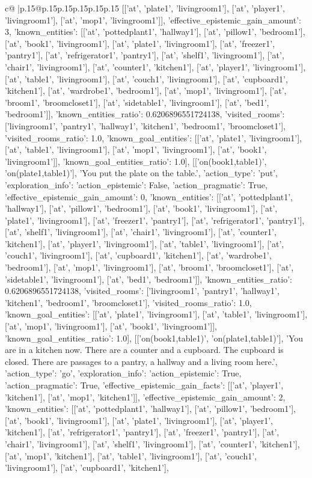 \documentclass{article}
\begin{document}
{\begin{supertabular}{c@{$\;$}|p{.15\linewidth}@{}p{.15\linewidth}p{.15\linewidth}p{.15\linewidth}p{.15\linewidth}p{.15\linewidth}}
{{{[['at', 'plate1', 'livingroom1'], ['at', 'player1', 'livingroom1'], ['at', 'mop1', 'livingroom1']], 'effective_epistemic_gain_amount': 3, 'known_entities': [['at', 'pottedplant1', 'hallway1'], ['at', 'pillow1', 'bedroom1'], ['at', 'book1', 'livingroom1'], ['at', 'plate1', 'livingroom1'], ['at', 'freezer1', 'pantry1'], ['at', 'refrigerator1', 'pantry1'], ['at', 'shelf1', 'livingroom1'], ['at', 'chair1', 'livingroom1'], ['at', 'counter1', 'kitchen1'], ['at', 'player1', 'livingroom1'], ['at', 'table1', 'livingroom1'], ['at', 'couch1', 'livingroom1'], ['at', 'cupboard1', 'kitchen1'], ['at', 'wardrobe1', 'bedroom1'], ['at', 'mop1', 'livingroom1'], ['at', 'broom1', 'broomcloset1'], ['at', 'sidetable1', 'livingroom1'], ['at', 'bed1', 'bedroom1']], 'known_entities_ratio': 0.6206896551724138, 'visited_rooms': ['livingroom1', 'pantry1', 'hallway1', 'kitchen1', 'bedroom1', 'broomcloset1'], 'visited_rooms_ratio': 1.0, 'known_goal_entities': [['at', 'plate1', 'livingroom1'], ['at', 'table1', 'livingroom1'], ['at', 'mop1', 'livingroom1'], ['at', 'book1', 'livingroom1']], 'known_goal_entities_ratio': 1.0}}], [['on(book1,table1)', 'on(plate1,table1)'], 'You put the plate on the table.', {'action_type': 'put', 'exploration_info': {'action_epistemic': False, 'action_pragmatic': True, 'effective_epistemic_gain_amount': 0, 'known_entities': [['at', 'pottedplant1', 'hallway1'], ['at', 'pillow1', 'bedroom1'], ['at', 'book1', 'livingroom1'], ['at', 'plate1', 'livingroom1'], ['at', 'freezer1', 'pantry1'], ['at', 'refrigerator1', 'pantry1'], ['at', 'shelf1', 'livingroom1'], ['at', 'chair1', 'livingroom1'], ['at', 'counter1', 'kitchen1'], ['at', 'player1', 'livingroom1'], ['at', 'table1', 'livingroom1'], ['at', 'couch1', 'livingroom1'], ['at', 'cupboard1', 'kitchen1'], ['at', 'wardrobe1', 'bedroom1'], ['at', 'mop1', 'livingroom1'], ['at', 'broom1', 'broomcloset1'], ['at', 'sidetable1', 'livingroom1'], ['at', 'bed1', 'bedroom1']], 'known_entities_ratio': 0.6206896551724138, 'visited_rooms': ['livingroom1', 'pantry1', 'hallway1', 'kitchen1', 'bedroom1', 'broomcloset1'], 'visited_rooms_ratio': 1.0, 'known_goal_entities': [['at', 'plate1', 'livingroom1'], ['at', 'table1', 'livingroom1'], ['at', 'mop1', 'livingroom1'], ['at', 'book1', 'livingroom1']], 'known_goal_entities_ratio': 1.0}}], [['on(book1,table1)', 'on(plate1,table1)'], 'You are in a kitchen now. There are a counter and a cupboard. The cupboard is closed. There are passages to a pantry, a hallway and a living room here.', {'action_type': 'go', 'exploration_info': {'action_epistemic': True, 'action_pragmatic': True, 'effective_epistemic_gain_facts': [['at', 'player1', 'kitchen1'], ['at', 'mop1', 'kitchen1']], 'effective_epistemic_gain_amount': 2, 'known_entities': [['at', 'pottedplant1', 'hallway1'], ['at', 'pillow1', 'bedroom1'], ['at', 'book1', 'livingroom1'], ['at', 'plate1', 'livingroom1'], ['at', 'player1', 'kitchen1'], ['at', 'refrigerator1', 'pantry1'], ['at', 'freezer1', 'pantry1'], ['at', 'chair1', 'livingroom1'], ['at', 'shelf1', 'livingroom1'], ['at', 'counter1', 'kitchen1'], ['at', 'mop1', 'kitchen1'], ['at', 'table1', 'livingroom1'], ['at', 'couch1', 'livingroom1'], ['at', 'cupboard1', 'kitchen1'], }}}
\end{supertabular}}
\end{document}

